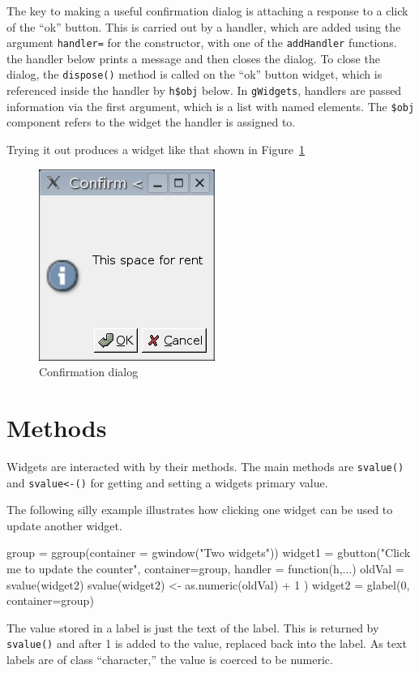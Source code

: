 \documentclass[12pt]{article}
\newcommand{\RCode}[1]{\texttt{#1}}
\newcommand{\RFunc}[1]{\texttt{#1()}}
\newcommand{\RArg}[1]{\texttt{#1=}}
\newcommand{\RListel}[1]{\texttt{\$#1}}
\begin{document}
The key to making a useful confirmation dialog is attaching a response
to a click of the ``ok'' button. This is carried out by a handler,
which are added using the argument \RArg{handler} for the constructor,
with one of the \RCode{addHandler} functions. the handler below prints
a message and then closes the dialog. To close the dialog, the
\RFunc{dispose} method is called on the ``ok'' button widget, which is
referenced inside the handler by \RCode{h\$obj} below. In
\RCode{gWidgets}, handlers are passed information via the first
argument, which is a list with named elements. The \RListel{obj}
component refers to the widget the handler is assigned to.

Trying it out produces a widget like that shown in Figure~\ref{fig:confirmDialog}

\begin{figure}[htbp]
  \centering
  \includegraphics[width=.35\textwidth]{confirmDialog}
  \caption{Confirmation dialog}
  \label{fig:confirmDialog}
\end{figure}


\section{Methods}

Widgets are interacted with by their methods. The main methods are
\RFunc{svalue} and \RFunc{svalue<-} for getting and setting a widgets
primary value. 

The following silly example illustrates how clicking one widget can be
used to update another widget.
\begin{Scode}
  group = ggroup(container = gwindow("Two widgets"))
  widget1 = gbutton("Click me to update the counter", container=group, 
  handler = function(h,...) {
    oldVal = svalue(widget2)
    svalue(widget2) <- as.numeric(oldVal) + 1
  })
  widget2 = glabel(0, container=group)
\end{Scode}
The value stored in a label is just the text of the label. This is
returned by \RFunc{svalue} and after 1 is added to the value, replaced
back into the label. As text labels are of class ``character,'' the
value is coerced to be numeric.
\end{document}
